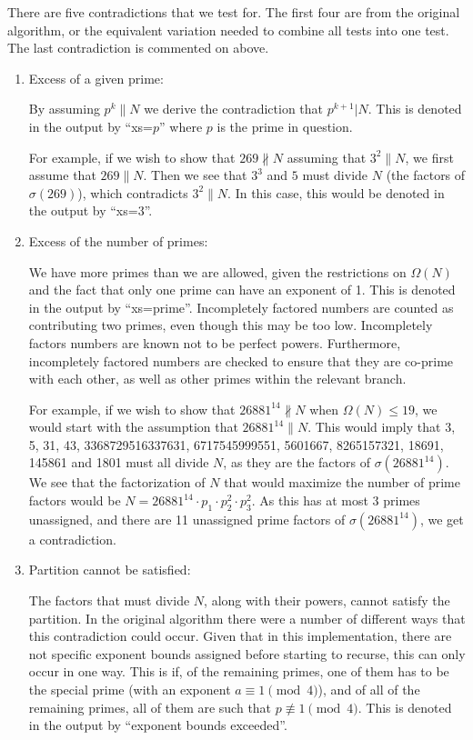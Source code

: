 \documentclass{article}
\begin{document}
There are five contradictions that we test for.
The first four are from the original algorithm, or the equivalent variation
    needed to combine all tests into one test.  
The last contradiction is commented on above.
\begin{enumerate}
\item Excess of a given prime: \label{cont:xs=p}

    By assuming $p^k \parallel N $ we derive the contradiction that
     $p^{k+1} | N$.
    This is denoted in the output by ``xs=$p$'' where $p$ is the prime in 
    question.

    For example, if we wish to show that $269 \nparallel N$ assuming
        that $3^2 \parallel N$, we first assume that $269 \parallel N$.
    Then we see that $3^3$ and $5$ must divide $N$ (the factors of 
        $\sigma(269)$), which contradicts $3^2 \parallel N$.
    In this case, this would be denoted in the output by ``xs=3''.

\item Excess of the number of primes: \label{cont:xs=prime}

    We have more primes than we are allowed, given the restrictions on 
    $\Omega(N)$ and the fact that only one prime can have an exponent of 1.
    This is denoted in the output by ``xs=prime''.
    Incompletely factored numbers are counted as contributing 
    two primes, even though this may be too low.
    Incompletely factors numbers are known not to be perfect powers.
    Furthermore, incompletely factored numbers are checked to ensure that 
    they are co-prime with each other, as well as other primes within 
    the relevant branch.

    For example, if we wish to show that $26881^{14} \nparallel N$ 
    when $\Omega(N) \leq 19$, we would start with the
    assumption that $26881^{14} \parallel N$.
    This would imply that 
    3, 5, 31, 43, 3368729516337631, 6717545999551, 5601667, 
    8265157321, 18691, 145861 and 1801 must all divide $N$, as they
    are the factors of $\sigma(26881^{14})$.
    We see that the factorization of $N$ that would maximize the number of prime
        factors would be $N = 26881^{14} \cdot p_1 \cdot p_2^2 \cdot p_3^2$.
    As this has at most 3 primes unassigned, and there are 11 unassigned prime 
        factors of $\sigma(26881^{14})$, we get a contradiction.
   
\item Partition cannot be satisfied: \label{cont:part}

    The factors that must divide $N$, along with their powers, cannot satisfy
        the partition.
    In the original algorithm there were a number of different ways that 
        this contradiction could occur.
    Given that in this implementation, there are not specific exponent
        bounds assigned before starting to recurse, this can only 
        occur in one way.
    This is if, of the remaining primes, one of them has to be the special
        prime (with an exponent $a \equiv 1 \pmod{4}$), and 
        of all of the remaining primes, all of them are such that
        $p \not\equiv 1 \pmod{4}$.
    This is denoted in the output by ``exponent bounds exceeded''.


\end{enumerate}
\end{document}
